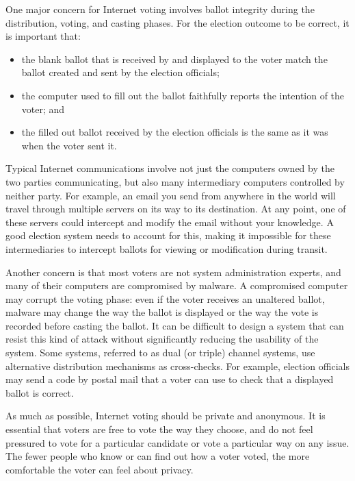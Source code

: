 One major concern for Internet voting involves ballot integrity during the
distribution, voting, and casting phases. For the election outcome to be
correct, it is important that:
\begin{itemize}
\item the blank ballot that is received by and displayed to the voter
  match the ballot created and sent by the election officials;
\item the computer used to fill out the ballot faithfully reports the
  intention of the voter; and
\item the filled out ballot received by the election officials is the
  same as it was when the voter sent it.
\end{itemize}
Typical Internet communications involve not just the computers owned
by the two parties communicating, but also many intermediary computers
controlled by neither party. For example, an email you send from
anywhere in the world will travel through multiple servers on its way
to its destination. At any point, one of these servers could intercept
and modify the email without your knowledge. A good election system
needs to account for this, making it impossible for these
intermediaries to intercept ballots for viewing or modification during
transit.

Another concern is that most voters are not system administration
experts, and many of their computers are compromised by malware. A
compromised computer may corrupt the voting phase: even if the voter
receives an unaltered ballot, malware may change the way the ballot is
displayed or the way the vote is recorded before casting the
ballot. It can be difficult to design a system that can resist this
kind of attack without significantly reducing the usability of the
system. Some systems, referred to as dual (or triple) channel systems,
use alternative distribution mechanisms as cross-checks. For example,
election officials may send a code by postal mail that a voter can use
to check that a displayed ballot is correct.

As much as possible, Internet voting should be private and
anonymous. It is essential that voters are free to vote the way they
choose, and do not feel pressured to vote for a particular candidate
or vote a particular way on any issue. The fewer people who know or
can find out how a voter voted, the more comfortable the voter can
feel about privacy.

